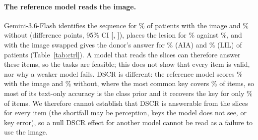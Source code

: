 \documentclass[conference]{IEEEtran}
\begin{document}
\paragraph{The reference model reads the image.} Gemini-3.6-Flash identifies the sequence for \vfourEoneOwnAIAGemini{}\% of patients with the image and \vfourEoneTextAIAGemini{}\% without (difference \vfourEoneDiffAIAGemini{} points, 95\% CI [\vfourEoneLoAIAGemini{}, \vfourEoneHiAIAGemini{}]), places the lesion for \vfourEoneOwnLILGemini{}\% against \vfourEoneTextLILGemini{}\%, and with the image swapped gives the donor's answer for \vfourEtwoSwapAIAGemini{}\% (AIA) and \vfourEtwoSwapLILGemini{}\% (LIL) of patients (Table~\ref{tab:ctrl}). A model that reads the slices can therefore answer these items, so the tasks are feasible; this does not show that every item is valid, nor why a weaker model fails. DSCR is different: the reference model scores \vfourEoneOwnDSCRGemini{}\% with the image and \vfourEoneTextDSCRGemini{}\% without, where the most common key covers \vfourMajorityDSCR{}\% of items, so most of its text-only accuracy is the class prior and it recovers the key for only \vfourEoneOwnDSCRGemini{}\% of items. We therefore cannot establish that DSCR is answerable from the slices for every item (the shortfall may be perception, keys the model does not see, or key error), so a null DSCR effect for another model cannot be read as a failure to use the image.
\end{document}
